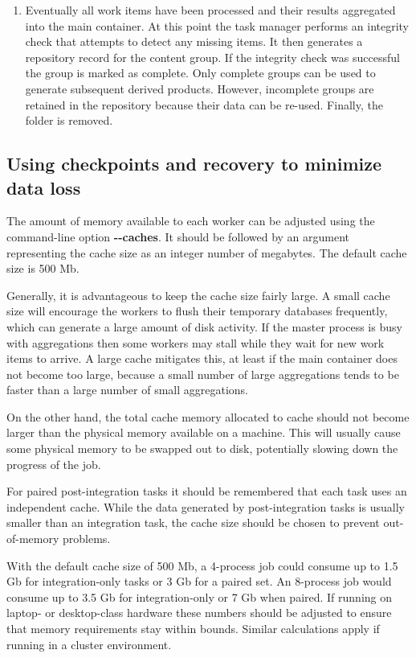 \documentclass[11pt,a4paper]{article}
\renewcommand{\texttt}[1]{{\ttfamily\fontseries{l}\selectfont{#1}}}
\newcounter{advancedbox}[section]
\newenvironment{advanced}[1]{\stepcounter{advancedbox}\begin{tcolorbox}[enhanced,breakable,colback=red!10,colbacktitle=red!20,colframe=red!40,coltitle=black,title={Advanced usage: {#1}},fonttitle=\sffamily\fontseries{b}\selectfont]}{\end{tcolorbox}}
\newcommand{\file}[1]{\texttt{{#1}}}
\newcommand{\option}[1]{{\ttfamily\bfseries\small #1}}
\begin{document}
\begin{enumerate}
    \item Eventually all work items have been processed
    and their results aggregated into the main container.
    At this point the task manager performs an integrity check
    that attempts to detect any missing items.
    It then generates a repository record for the content group.
    If the integrity check was successful the group is marked
    as complete.
    Only complete groups can be used to generate subsequent
    derived products.
    However,
    incomplete groups are retained in the repository because their
    data can be re-used.
    Finally, the \file{tempfiles} folder is removed.
\end{enumerate}

\subsection{Using checkpoints and recovery to minimize data loss}
\label{sec:checkpointing}
The amount of memory available to each worker can be adjusted using
the command-line option
\option{{-}{-}caches}.
It should be followed by an argument representing the cache size
as an integer number of megabytes.
The default cache size is 500 Mb.

Generally, it is advantageous to keep the cache size fairly large.
A small cache size will encourage the workers to flush their
temporary databases frequently, which can generate a large amount
of disk activity.
If the master process is busy with aggregations then
some workers may stall while they wait for new work items to arrive.
A large cache mitigates this, at least if the main container
does not become too large, because a small number of
large aggregations tends to be faster than a large number of small
aggregations.

On the other hand, the total cache memory
allocated to cache should not become larger than the physical
memory available on a machine.
This will usually cause some physical memory to be swapped
out to disk, potentially slowing down the progress of the job.

\begin{advanced}{Estimating cache requirements with paired tasks}
    For paired post-integration tasks it should be remembered that
    each task uses an independent cache.
    While the data generated by post-integration tasks is usually
    smaller than an integration task, the cache size should be
    chosen to prevent out-of-memory problems.
    
    With the default cache size of 500 Mb, a 4-process job could
    consume up to 1.5 Gb for integration-only tasks
    or 3 Gb for a paired set.
    An 8-process job would consume up to 3.5 Gb for
    integration-only or 7 Gb when paired.
    If running on laptop- or desktop-class hardware these numbers
    should be adjusted to ensure that memory requirements stay within
    bounds.
    Similar calculations apply if running in a cluster environment.
\end{advanced}
\end{document}
